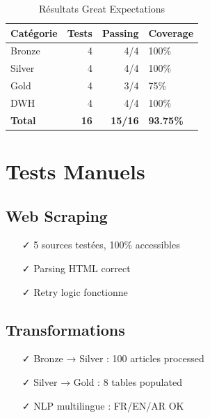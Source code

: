 \documentclass[12pt,a4paper]{report}
\begin{document}
\begin{table}[H]
    \centering
    \begin{tabular}{lrr}
        \toprule
        \textbf{Catégorie} & \textbf{Tests} & \textbf{Passing} & \textbf{Coverage} \\
        \midrule
        Bronze             & 4              & 4/4              & 100\%             \\
        Silver             & 4              & 4/4              & 100\%             \\
        Gold               & 4              & 3/4              & 75\%              \\
        DWH                & 4              & 4/4              & 100\%             \\
        \midrule
        \textbf{Total}     & \textbf{16}    & \textbf{15/16}   & \textbf{93.75\%}  \\
        \bottomrule
    \end{tabular}
    \caption{Résultats Great Expectations}
\end{table}

\section{Tests Manuels}

\subsection{Web Scraping}

\begin{itemize}
    \item[✓] 5 sources testées, 100\% accessibles
    \item[✓] Parsing HTML correct
    \item[✓] Retry logic fonctionne
\end{itemize}

\subsection{Transformations}

\begin{itemize}
    \item[✓] Bronze → Silver : 100 articles processed
    \item[✓] Silver → Gold : 8 tables populated
    \item[✓] NLP multilingue : FR/EN/AR OK
\end{itemize}
\end{document}
